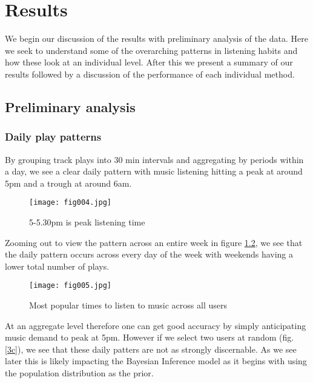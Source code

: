
\chapter{Results}

\label{Chapter4}

We begin our discussion of the results with preliminary analysis of the data. Here we seek to understand some of the overarching patterns in listening habits and how these look at an individual level. After this we present a summary of our results followed by a discussion of the performance of each individual method.

\section{Preliminary analysis}

\subsection{Daily play patterns}

By grouping track plays into 30 min intervals and aggregating by periods within a day, we see a clear daily pattern with music listening hitting a peak at around 5pm and a trough at around 6am.

\begin{figure}[h!]
	\centering
	\texttt{[image: fig004.jpg]}
	\caption{5-5.30pm is peak listening time}
	\label{3a}
\end{figure} 

Zooming out to view the pattern across an entire week in figure \ref{3b}, we see that the daily pattern occurs across every day of the week with weekends having a lower total number of plays.

\begin{figure}[h!]
	\centering
	\texttt{[image: fig005.jpg]}
	\caption{Most popular times to listen to music across all users}
	\label{3b}
\end{figure} 

At an aggregate level therefore one can get good accuracy by simply anticipating music demand to peak at 5pm. However if we select two users at random (fig. \ref{3c}), we see that these daily patters are not as strongly discernable. As we see later this is likely impacting the Bayesian Inference model as it begins with using the population distribution as the prior. 

